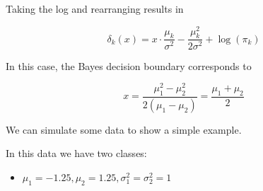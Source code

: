 \documentclass[
]{article}
\providecommand{\tightlist}{%
  \setlength{\itemsep}{0pt}\setlength{\parskip}{0pt}}
\begin{document}
Taking the log and rearranging results in

\[
\delta_{k}(x)=x \cdot \frac{\mu_{k}}{\sigma^{2}}-\frac{\mu_{k}^{2}}{2 \sigma^{2}}+\log \left(\pi_{k}\right)
\]

In this case, the Bayes decision boundary corresponds to

\[
x=\frac{\mu_{1}^{2}-\mu_{2}^{2}}{2\left(\mu_{1}-\mu_{2}\right)}=\frac{\mu_{1}+\mu_{2}}{2}
\]

We can simulate some data to show a simple example.

In this data we have two classes:

\begin{itemize}
\tightlist
\item
  \(\mu_1 = -1.25, \mu_2 = 1.25, \sigma_1^2 = \sigma_2^2 = 1\)
\end{itemize}
\end{document}
